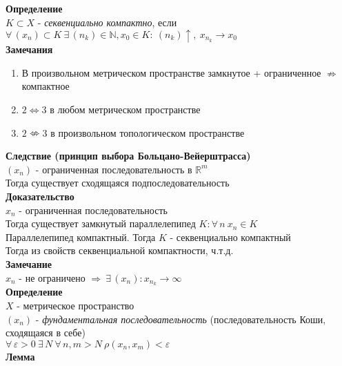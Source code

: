 \documentclass[12pt]{article}
\begin{document}
\textbf{Определение}\\
$K \subset X$ - \textit{секвенциально компактно}, если $\forall\,(x_n) \subset K\ \exists\,(n_k)\in\mathbb{N}, x_0\in K:\ (n_k)\uparrow,\ x_{n_k}\rightarrow x_0$\\
\textbf{Замечания}
\begin{enumerate}
    \item В произвольном метрическом пространстве замкнутое + ограниченное $\nRightarrow$ компактное
    \item $2 \Leftrightarrow 3$ в любом метрическом пространстве
    \item $2 \nLeftrightarrow 3$ в произвольном топологическом пространстве
\end{enumerate}
\textbf{Следствие (принцип выбора Больцано-Вейерштрасса)}\\
$(x_n)$ - ограниченная последовательность в $\mathbb{R}^m$\\
Тогда существует сходящаяся подпоследовательность\\
\textbf{Доказательство}\\
$x_n$ - ограниченная последовательность\\
Тогда существует замкнутый параллелепипед $K: \forall\,n\ x_n\in K$\\
Параллелепипед компактный.
Тогда $K$ -  секвенциально компактный\\
Тогда из свойств секвенциальной компактности, ч.т.д.\\
\textbf{Замечание}\\
$x_n$ - не ограничено $\Rightarrow\ \exists\,(x_n):x_{n_k} \rightarrow \infty$\\
\textbf{Определение}\\
$X$ - метрическое пространство\\
$(x_n)$ - \textit{фундаментальная последовательность} (последовательность Коши, сходящаяся в себе)\\
$\forall\,\varepsilon>0\ \exists\,N\ \forall\,n,m>N\ \rho(x_n,x_m) < \varepsilon$\\
\textbf{Лемма}
\end{document}
